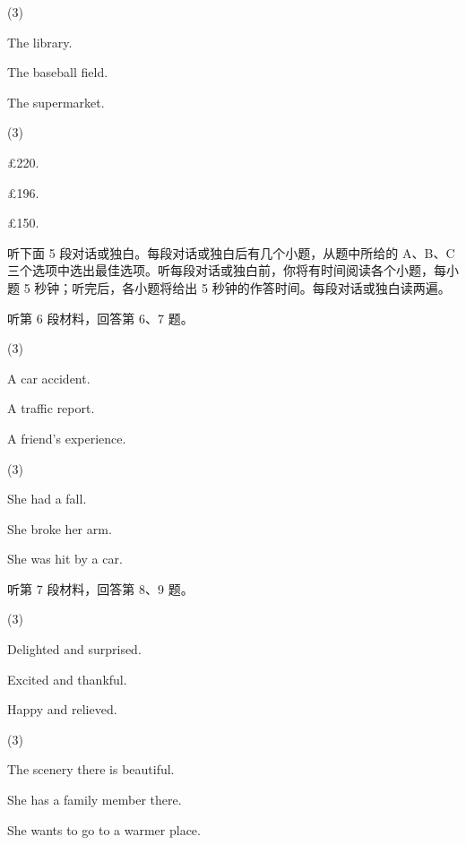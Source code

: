 \documentclass{英语试卷}
\begin{document}
\begin{choices}(3)
  \item The library.
  \item The baseball field.
  \item The supermarket.
\end{choices}
\begin{choices}(3)
  \item £220.
  \item £196.
  \item £150.
\end{choices}
\par 听下面 5 段对话或独白。每段对话或独白后有几个小题，从题中所给的 A、B、C 三个选项中选出最佳选项。听每段对话或独白前，你将有时间阅读各个小题，每小题 5 秒钟；听完后，各小题将给出 5 秒钟的作答时间。每段对话或独白读两遍。\par
\par 听第 6 段材料，回答第 6、7 题。\par
{}
\begin{choices}(3)
  \item A car accident.
  \item A traffic report.
  \item A friend's experience.
\end{choices}
\begin{choices}(3)
  \item She had a fall.
  \item She broke her arm.
  \item She was hit by a car.
\end{choices}
\par 听第 7 段材料，回答第 8、9 题。\par
{}
\begin{choices}(3)
  \item Delighted and surprised.
  \item Excited and thankful.
  \item Happy and relieved.
\end{choices}
\begin{choices}(3)
  \item The scenery there is beautiful.
  \item She has a family member there.
  \item She wants to go to a warmer place.
\end{choices}
\end{document}
